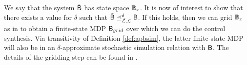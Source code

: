 \documentclass{ifacconf}
\newcommand{\red}[1]{{\color{red} #1}}
\renewcommand{\axx}[1]{{\color{orange} Ali: #1}}
\begin{document}

We say that the system $\tilde {\mathsf{B}}$ has state space $\mathbb{B}_{x}$. It is now of interest to show that there exists a value for $\delta$ such that  $\tilde {\mathsf{B}}\preceq^\delta_{\tilde {\mathcal{L}},\mathcal{L}} \mathsf{B}$. If this holds, then we can grid $\mathbb{B}_x$ as in \citep{haesaert2017verification,tech_report_TACAS} to obtain a finite-state MDP $\tilde {\mathsf{B}}_{grid}$ over which we can do the control synthesis. Via transitivity of Definition \ref{def:apbsim}, the latter finite-state MDP will also be in an $\delta$-approximate stochastic simulation relation with $\mathsf{B}$. The details of the gridding step can be found in \citep{tech_report_TACAS}. 


%
\end{document}
